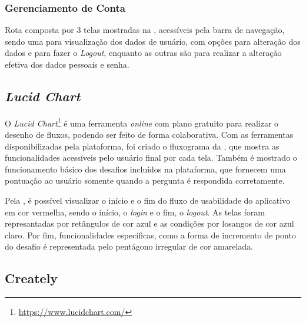 
\subsubsection{Gerenciamento de Conta}

Rota composta por 3 telas mostradas na , acessíveis pela barra de navegação, sendo uma para visualização dos dados de usuário, com opções para alteração dos dados e para fazer o \textit{Logout}, enquanto as outras são para realizar a alteração efetiva dos dados pessoais e senha.


\subsection{\textit{Lucid Chart}}
\label{lucidChart}

O \textit{Lucid Chart}\footnote{\url{https://www.lucidchart.com/}} é uma ferramenta \textit{online} com plano gratuito para realizar o desenho de fluxos, podendo ser feito de forma colaborativa. Com as ferramentas disponibilizadas pela plataforma, foi criado o fluxograma da , que mostra as funcionalidades acessíveis pelo usuário final por cada tela. Também é mostrado o funcionamento básico dos desafios incluídos na plataforma, que fornecem uma pontuação ao usuário somente quando a pergunta é respondida corretamente.


Pela , é possível visualizar o início e o fim do fluxo de usabilidade do aplicativo em cor vermelha, sendo o início, o \textit{login} e o fim, o \textit{logout}. As telas foram represantadas por retângulos de cor azul e as condições por losangos de cor azul claro. Por fim, funcionalidades específicas, como a forma de incremento de ponto do desafio é representada pelo pentágono irregular de cor amarelada.

\subsection{Creately}
\label{creately}

